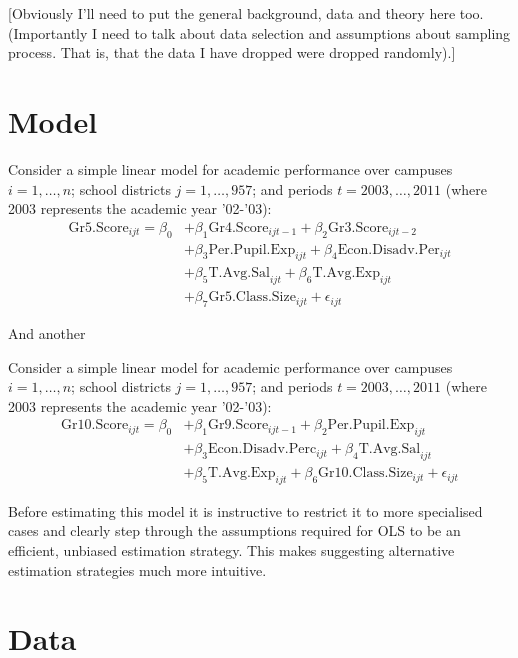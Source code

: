 \documentclass[11pt]{article}
\begin{document}
[Obviously I'll need to put the general background, data and theory here too. (Importantly I need to talk about data selection and assumptions about sampling process. That is, that the data I have dropped were dropped randomly).]

\section{Model}
\label{s:next}

Consider a simple linear model for academic performance over campuses $i=1,\ldots,n$; school districts $j=1,\ldots,957$; and periods $t=2003,\ldots,2011$ (where 2003 represents the academic year '02-'03):
  \begin{align*}
\mathrm{Gr5.Score}_{ijt} = \beta_{0} 
&+ \beta_{1}  \mathrm{Gr4.Score}_{ijt-1} 
+ \beta_{2}  \mathrm{Gr3.Score}_{ijt-2}    \\
&+ \beta_{3}  \mathrm{Per.Pupil.Exp}_{ijt} 
+ \beta_{4}  \mathrm{Econ.Disadv.Per}_{ijt} \\
&+ \beta_{5}  \mathrm{T.Avg.Sal}_{ijt}   
+ \beta_{6}  \mathrm{T.Avg.Exp}_{ijt}  \\
&+ \beta_{7}  \mathrm{Gr5.Class.Size}_{ijt} + \epsilon_{ijt}
\end{align*}

And another

Consider a simple linear model for academic performance over campuses $i=1,\ldots,n$; school districts $j=1,\ldots,957$; and periods $t=2003,\ldots,2011$ (where 2003 represents the academic year '02-'03):
  \begin{align*}
\mathrm{Gr10.Score}_{ijt} = \beta_{0} 
&+ \beta_{1}  \mathrm{Gr9.Score}_{ijt-1} 
+ \beta_{2}  \mathrm{Per.Pupil.Exp}_{ijt} \\
&+ \beta_{3}  \mathrm{Econ.Disadv.Perc}_{ijt} 
+ \beta_{4}  \mathrm{T.Avg.Sal}_{ijt}  \\
&+ \beta_{5}  \mathrm{T.Avg.Exp}_{ijt}  
+ \beta_{6}  \mathrm{Gr10.Class.Size}_{ijt} + \epsilon_{ijt}
\end{align*}


Before estimating this model it is instructive to restrict it to more specialised cases and clearly step through the assumptions required for OLS to be an efficient, unbiased estimation strategy. This makes suggesting alternative estimation strategies much more intuitive.

\section{Data}
\end{document}
